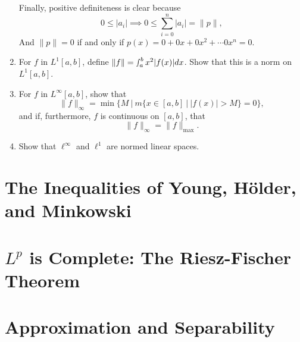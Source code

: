 \begin{enumerate}
\[	\]
	Finally, positive definiteness is clear because
	\[
		0 \le |a_i| \implies 0\le \sum_{i=0}^n| a_i|=\|p\|,
	\]
	And $\|p\|=0$ if and only if $p(x)= 0+0x+0x^2+\cdots0x^n=0$.
	\item For $f$ in $L^1[a,b]$, define $\|f\| = \smallint_a^b x^2 |f(x)|dx$.
	Show that this is a norm on $L^1[a,b]$.
	\item For $f$ in $L^\infty[a,b]$, show that 
	\[
	\| f\|_\infty = \min \biggl \{ M \ \biggl |\ m \{x \in [a,b]\ |\ |f(x)| > M \} =0 \biggr \},
	\] 
	and if, furthermore, $f$ is continuous on $[a,b]$, that
	\[
	\| f \|_{\infty} = \| f \|_{\max}.	
	\]
	\item Show that $\ell^\infty$ and $\ell^1$ are normed linear spaces.
\end{enumerate}

\section{The Inequalities of Young, H\"older, and Minkowski}

\section{$L^p$ is Complete: The Riesz-Fischer Theorem}

\section{Approximation and Separability}
